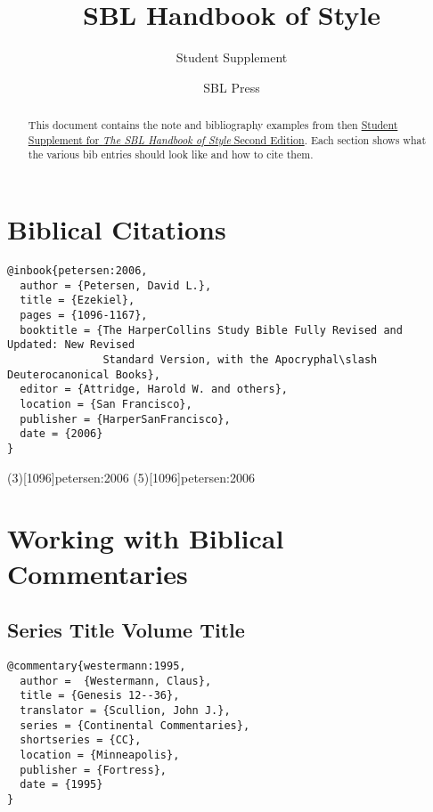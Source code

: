 \documentclass[a4paper]{article}
\begin{document}
\title{SBL Handbook of Style}
\author{Student Supplement}
\date{SBL Press}
\maketitle

\begin{abstract}
  This document contains the note and bibliography examples from then
  \href{https://www.sbl-site.org/assets/pdfs/pubs/sblhssupp2015-02.pdf}{Student
  Supplement for \emph{The SBL Handbook of Style} Second Edition}. Each
  section shows what the various bib entries should look like and how to cite
  them.
\end{abstract}

\tableofcontents

\section{Biblical Citations}

\begin{verbatim}
@inbook{petersen:2006,
  author = {Petersen, David L.},
  title = {Ezekiel},
  pages = {1096-1167},
  booktitle = {The HarperCollins Study Bible Fully Revised and Updated: New Revised
               Standard Version, with the Apocryphal\slash Deuterocanonical Books},
  editor = {Attridge, Harold W. and others},
  location = {San Francisco},
  publisher = {HarperSanFrancisco},
  date = {2006}
}
\end{verbatim}

\examplecite(3)[1096]{petersen:2006}
\examplecite(5)[1096]{petersen:2006}
\examplebibliography

\section{Working with Biblical Commentaries}

\subsection{Series Title Volume Title}

\begin{verbatim}
@commentary{westermann:1995,
  author =  {Westermann, Claus},
  title = {Genesis 12--36},
  translator = {Scullion, John J.},
  series = {Continental Commentaries},
  shortseries = {CC},
  location = {Minneapolis},
  publisher = {Fortress},
  date = {1995}
}
\end{verbatim}
\end{document}
